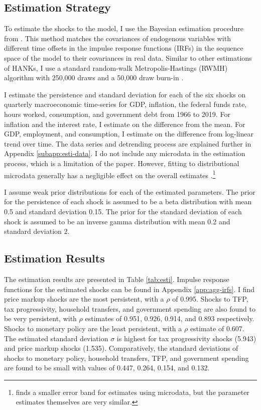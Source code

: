 \subsection{Estimation Strategy}

To estimate the shocks to the model, I use the Bayesian estimation procedure from \textcite{auclert2021using}. This method matches the covariances of endogenous variables with different time offsets in the impulse response functions (IRFs) in the sequence space of the model to their covariances in real data. Similar to other estimations of HANKs, I use a standard random-walk Metropolis-Hastings (RWMH) algorithm with 250,000 draws and a 50,000 draw burn-in \autocites{auclert2021using}{bayer2024shocks}.

I estimate the persistence and standard deviation for each of the six shocks on quarterly macroeconomic time-series for GDP, inflation, the federal funds rate, hours worked, consumption, and government debt from 1966 to 2019. For inflation and the interest rate, I estimate on the difference from the mean. For GDP, employment, and consumption, I estimate on the difference from log-linear trend over time. The data series and detrending process are explained further in Appendix \ref{subapp:esti-data}. I do not include any microdata in the estimation process, which is a limitation of the paper. However, fitting to distributional microdata generally has a negligible effect on the overall estimates \autocite{bayer2024shocks}.\footnote{\textcite{iao2024estimating} finds a smaller error band for estimates using microdata, but the parameter estimates themselves are very similar.}

I assume weak prior distributions for each of the estimated parameters. The prior for the persistence of each shock is assumed to be a beta distribution with mean 0.5 and standard deviation 0.15. The prior for the standard deviation of each shock is assumed to be an inverse gamma distribution with mean 0.2 and standard deviation 2.


\subsection{Estimation Results}

The estimation results are presented in Table \ref{tab:esti}. Impulse response functions for the estimated shocks can be found in Appendix \ref{app:agg-irfs}. I find price markup shocks are the most persistent, with a $\rho$ of 0.995. Shocks to TFP, tax progressivity, household transfers, and government spending are also found to be very persistent, with $\rho$ estimates of 0.951, 0.926, 0.914, and 0.893 respectively. Shocks to monetary policy are the least persistent, with a $\rho$ estimate of 0.607. The estimated standard deviation $\sigma$ is highest for tax progressivity shocks (5.943) and price markup shocks (1.535). Comparatively, the standard deviations of shocks to monetary policy, household transfers, TFP, and government spending are found to be small with values of 0.447, 0.264, 0.154, and 0.132.

